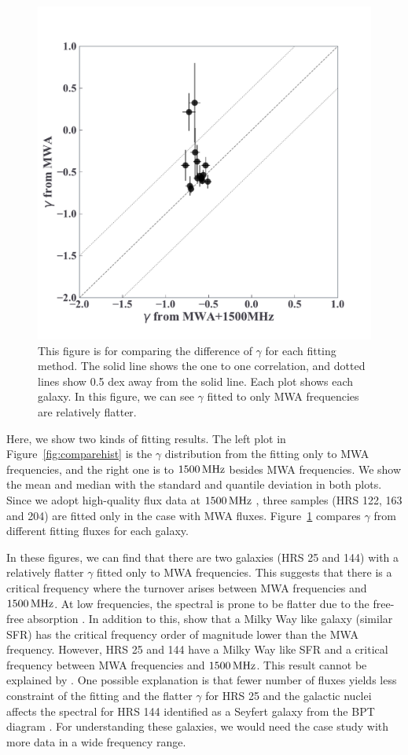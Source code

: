 \begin{figure}[htbp]
	\centering
	\includegraphics[width=.6\linewidth]{Chapter_5/Figures/Result_comparealpha.pdf}
    \caption[The comparison of $\gamma$ from different fitting methods]{\label{fig:comparegamma}
        This figure is for comparing the difference of $\gamma$ for each fitting method.
        The solid line shows the one to one correlation, and dotted lines show 0.5 dex away from the solid line.
        Each plot shows each galaxy.
        In this figure, we can see $\gamma$ fitted to only MWA frequencies are relatively flatter.
    }
\end{figure}

Here, we show two kinds of fitting results.
The left plot in Figure~\ref{fig:comparehist} is the $\gamma$ distribution from the fitting only to MWA frequencies, and the right one is to $1500\,\mathrm{MHz}$ besides MWA frequencies.
We show the mean and median with the standard and quantile deviation in both plots.
Since we adopt high-quality flux data at $1500\,\mathrm{MHz}$ \citep{Boselli2015}, three samples (HRS 122, 163 and 204) are fitted only in the case with MWA fluxes.
Figure~\ref{fig:comparegamma} compares $\gamma$ from different fitting fluxes for each galaxy.

In these figures, we can find that there are two galaxies (HRS 25 and 144) with a relatively flatter $\gamma$ fitted only to MWA frequencies.
This suggests that there is a critical frequency where the turnover arises between MWA frequencies and $1500\,\mathrm{MHz}$.
At low frequencies, the spectral is prone to be flatter due to the free-free absorption \citep[e.g.,][]{CalistroRivera2017a, Schober2017, Chyzy2018}.
In addition to this, \citet{Schober2017} show that a Milky Way like galaxy (similar SFR) has the critical frequency order of magnitude lower than the MWA frequency.
However, HRS 25 and 144 have a Milky Way like SFR \citep{Boselli2015} and a critical frequency between MWA frequencies and $1500\,\mathrm{MHz}$.
This result cannot be explained by \citet{Schober2017}.
One possible explanation is that fewer number of fluxes yields less constraint of the fitting and the flatter $\gamma$ for HRS 25 and the galactic nuclei affects the spectral for HRS 144 identified as a Seyfert galaxy from the BPT diagram \citep[e.g.,][]{Baldwin1981, Kewley2001, Kauffmann2003, Schawinski2007}.
For understanding these galaxies, we would need the case study with more data in a wide frequency range.

